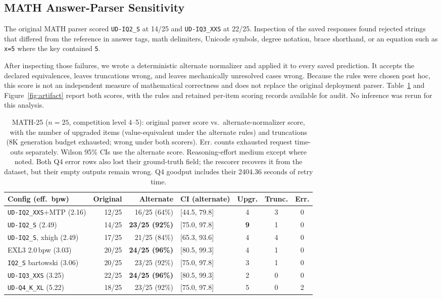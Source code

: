 \documentclass[11pt]{article}
\newcommand{\q}[1]{\texttt{#1}}
\begin{document}
\subsection{MATH Answer-Parser Sensitivity}
\label{sec:artifact}

The original MATH parser scored \q{UD-IQ2\_S} at 14/25 and
\q{UD-IQ3\_XXS} at 22/25. Inspection of the saved responses found rejected
strings that differed from the reference in answer tags, math delimiters,
Unicode symbols, degree notation, brace shorthand, or an equation such as
\q{x=5} where the key contained \q{5}.

After inspecting those failures, we wrote a deterministic alternate
normalizer and applied it to every saved prediction. It accepts the declared
equivalences, leaves truncations wrong, and leaves mechanically unresolved
cases wrong. Because the rules were chosen post hoc, this score is not an
independent measure of mathematical correctness and does not replace the
original deployment parser. Table~\ref{tab:math25} and
Figure~\ref{fig:artifact} report both scores, with the rules and retained
per-item scoring records available for audit. No inference was rerun for this
analysis.

\begin{table}[t]
\centering
\small
\caption{MATH-25 ($n{=}25$, competition level 4--5): original parser score
vs.\ alternate-normalizer score, with the number of upgraded items
(value-equivalent under the alternate rules) and truncations (8K generation
budget exhausted; wrong under both scorers). Err. counts exhausted request
time-outs separately. Wilson 95\% CIs use the alternate score. Reasoning-effort
medium except where noted. Both Q4 error rows also lost their ground-truth
field; the rescorer recovers it from the dataset, but their empty outputs
remain wrong. Q4 goodput includes their 2404.36 seconds of retry time.}
\label{tab:math25}
\setlength{\tabcolsep}{3pt}
\begin{tabular}{lrrlccc}
\toprule
Config (eff.\ bpw) & Original & Alternate & CI (alternate) & Upgr. & Trunc. & Err. \\
\midrule
\q{UD-IQ2\_XXS}+MTP (2.16) & 12/25 & 16/25 (64\%) & [44.5, 79.8] & 4 & 3 & 0 \\
\q{UD-IQ2\_S} (2.49) & 14/25 & \textbf{23/25 (92\%)} & [75.0, 97.8] & \textbf{9} & 1 & 0 \\
\q{UD-IQ2\_S}, xhigh (2.49) & 17/25 & 21/25 (84\%) & [65.3, 93.6] & 4 & 4 & 0 \\
EXL3 2.0\,bpw (3.03) & 20/25 & \textbf{24/25 (96\%)} & [80.5, 99.3] & 4 & 1 & 0 \\
\q{IQ2\_S} bartowski (3.06) & 20/25 & 23/25 (92\%) & [75.0, 97.8] & 3 & 1 & 0 \\
\q{UD-IQ3\_XXS} (3.25) & 22/25 & \textbf{24/25 (96\%)} & [80.5, 99.3] & 2 & 0 & 0 \\
\q{UD-Q4\_K\_XL} (5.22) & 18/25 & 23/25 (92\%) & [75.0, 97.8] & 5 & 0 & 2 \\
\bottomrule
\end{tabular}
\end{table}
\end{document}

